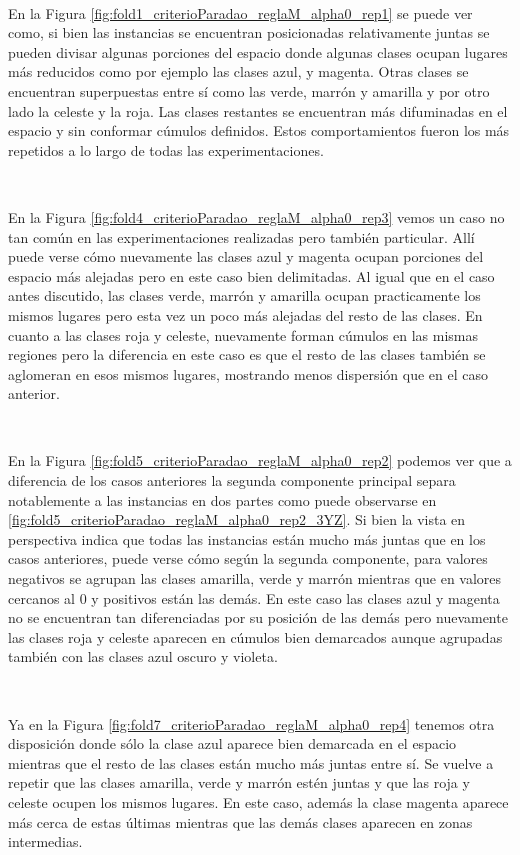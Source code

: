 \documentclass[informe.tex]{subfiles}
\begin{document}
	~
	
	En la Figura \ref{fig:fold1_criterioParadao_reglaM_alpha0_rep1} se puede ver como, si bien las instancias se encuentran posicionadas relativamente juntas se pueden divisar algunas porciones del espacio donde algunas clases ocupan lugares m\'as reducidos como por ejemplo las clases azul, y magenta. Otras clases se encuentran superpuestas entre sí como las verde, marrón y amarilla y por otro lado la celeste y la roja. Las clases restantes se encuentran más difuminadas en el espacio y sin conformar cúmulos definidos. Estos comportamientos fueron los más repetidos a lo largo de todas las experimentaciones.
	
	~
	
	En la Figura \ref{fig:fold4_criterioParadao_reglaM_alpha0_rep3} vemos un caso no tan común en las experimentaciones realizadas pero también particular. Allí puede verse cómo nuevamente las clases azul y magenta ocupan porciones del espacio más alejadas pero en este caso bien delimitadas. Al igual que en el caso antes discutido, las clases verde, marrón y amarilla ocupan practicamente los mismos lugares pero esta vez un poco más alejadas del resto de las clases. En cuanto a las clases roja y celeste, nuevamente forman cúmulos en las mismas regiones pero la diferencia en este caso es que el resto de las clases también se aglomeran en esos mismos lugares, mostrando menos dispersión que en el caso anterior.
	
	~
	
	En la Figura \ref{fig:fold5_criterioParadao_reglaM_alpha0_rep2} podemos ver que a diferencia de los casos anteriores la segunda componente principal separa notablemente a las instancias en dos partes como puede observarse en \ref{fig:fold5_criterioParadao_reglaM_alpha0_rep2_3YZ}. Si bien la vista en perspectiva indica que todas las instancias están mucho más juntas que en los casos anteriores, puede verse cómo según la segunda componente, para valores negativos se agrupan las clases amarilla, verde y marrón mientras que en valores cercanos al 0 y positivos están las demás. En este caso las clases azul y magenta no se encuentran tan diferenciadas por su posición de las demás pero nuevamente las clases roja y celeste aparecen en cúmulos bien demarcados aunque agrupadas también con las clases azul oscuro y violeta. 
	
	~
	
	Ya en la Figura \ref{fig:fold7_criterioParadao_reglaM_alpha0_rep4} tenemos otra disposición donde sólo la clase azul aparece bien demarcada en el espacio mientras que el resto de las clases están mucho más juntas entre sí. Se vuelve a repetir que las clases amarilla, verde y marrón estén juntas y que las roja y celeste ocupen los mismos lugares. En este caso, además la clase magenta aparece más cerca de estas últimas mientras que las demás clases aparecen en zonas intermedias.
	
\end{document}
